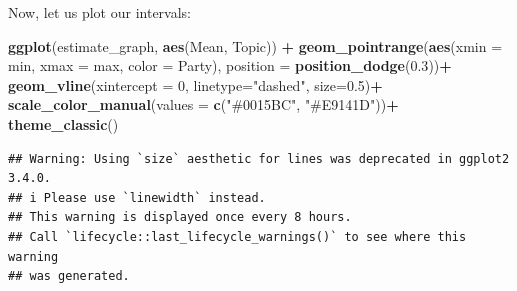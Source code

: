\documentclass[
]{book}
\newenvironment{Shaded}{\begin{snugshade}}{\end{snugshade}}
\newcommand{\AttributeTok}[1]{\textcolor[rgb]{0.13,0.29,0.53}{#1}}
\newcommand{\DecValTok}[1]{\textcolor[rgb]{0.00,0.00,0.81}{#1}}
\newcommand{\FloatTok}[1]{\textcolor[rgb]{0.00,0.00,0.81}{#1}}
\newcommand{\FunctionTok}[1]{\textcolor[rgb]{0.13,0.29,0.53}{\textbf{#1}}}
\newcommand{\NormalTok}[1]{#1}
\newcommand{\OtherTok}[1]{\textcolor[rgb]{0.56,0.35,0.01}{#1}}
\newcommand{\SpecialCharTok}[1]{\textcolor[rgb]{0.81,0.36,0.00}{\textbf{#1}}}
\newcommand{\StringTok}[1]{\textcolor[rgb]{0.31,0.60,0.02}{#1}}
\begin{document}
\begin{Shaded}
\end{Shaded}

Now, let us plot our intervals:

\begin{Shaded}
\begin{Highlighting}[]
\FunctionTok{ggplot}\NormalTok{(estimate\_graph, }\FunctionTok{aes}\NormalTok{(Mean, Topic)) }\SpecialCharTok{+}
 \FunctionTok{geom\_pointrange}\NormalTok{(}\FunctionTok{aes}\NormalTok{(}\AttributeTok{xmin =}\NormalTok{ min, }\AttributeTok{xmax =}\NormalTok{ max, }\AttributeTok{color =}\NormalTok{ Party),}
                 \AttributeTok{position =} \FunctionTok{position\_dodge}\NormalTok{(}\FloatTok{0.3}\NormalTok{))}\SpecialCharTok{+}
 \FunctionTok{geom\_vline}\NormalTok{(}\AttributeTok{xintercept =} \DecValTok{0}\NormalTok{,}
            \AttributeTok{linetype=}\StringTok{"dashed"}\NormalTok{, }\AttributeTok{size=}\FloatTok{0.5}\NormalTok{)}\SpecialCharTok{+}
 \FunctionTok{scale\_color\_manual}\NormalTok{(}\AttributeTok{values =} \FunctionTok{c}\NormalTok{(}\StringTok{"\#0015BC"}\NormalTok{, }\StringTok{"\#E9141D"}\NormalTok{))}\SpecialCharTok{+}
 \FunctionTok{theme\_classic}\NormalTok{()}
\end{Highlighting}
\end{Shaded}

\begin{verbatim}
## Warning: Using `size` aesthetic for lines was deprecated in ggplot2 3.4.0.
## i Please use `linewidth` instead.
## This warning is displayed once every 8 hours.
## Call `lifecycle::last_lifecycle_warnings()` to see where this warning
## was generated.
\end{verbatim}
\end{document}
